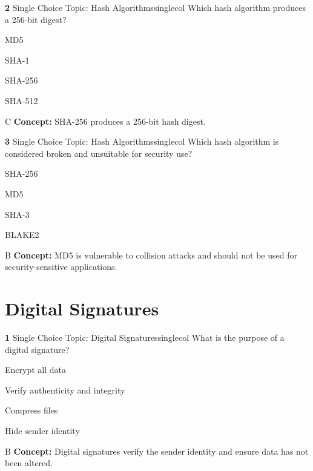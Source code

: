 \documentclass[10pt,a4paper]{article}
\begin{document}
\begin{qcard}{\color{white}\textbf{2} \hfill \small Single Choice \textbar{} Topic: Hash Algorithms}{singlecol}
Which hash algorithm produces a 256-bit digest?

\begin{qoptions}
\item MD5
\item SHA-1
\item SHA-256
\item SHA-512
\end{qoptions}
\begin{explainbox}{C}
\textbf{Concept:} SHA-256 produces a 256-bit hash digest.
\end{explainbox}
\end{qcard}

\begin{qcard}{\color{white}\textbf{3} \hfill \small Single Choice \textbar{} Topic: Hash Algorithms}{singlecol}
Which hash algorithm is considered broken and unsuitable for security use?

\begin{qoptions}
\item SHA-256
\item MD5
\item SHA-3
\item BLAKE2
\end{qoptions}
\begin{explainbox}{B}
\textbf{Concept:} MD5 is vulnerable to collision attacks and should not be used for security-sensitive applications.
\end{explainbox}
\end{qcard}

\section{Digital Signatures}
\begin{qcard}{\color{white}\textbf{1} \hfill \small Single Choice \textbar{} Topic: Digital Signatures}{singlecol}
What is the purpose of a digital signature?

\begin{qoptions}
\item Encrypt all data
\item Verify authenticity and integrity
\item Compress files
\item Hide sender identity
\end{qoptions}
\begin{explainbox}{B}
\textbf{Concept:} Digital signatures verify the sender identity and ensure data has not been altered.
\end{explainbox}
\end{qcard}
\end{document}
